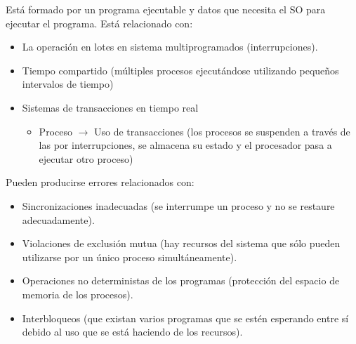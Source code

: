 \begin{definicion}[Proceso]
    Está formado por un programa ejecutable y datos que necesita el SO para ejecutar el programa. Está relacionado con:
    \begin{itemize}
        \item La operación en lotes en sistema multiprogramados (interrupciones).

        \item Tiempo compartido (múltiples procesos ejecutándose utilizando pequeños intervalos de tiempo)

        \item Sistemas de transacciones en tiempo real
        \begin{itemize}
            \item Proceso $\longrightarrow$ Uso de transacciones (los procesos se suspenden a través de las por interrupciones, se almacena su estado y el procesador pasa a ejecutar otro proceso) 
        \end{itemize}
    \end{itemize}

    Pueden producirse errores relacionados con:
    \begin{itemize}
        \item Sincronizaciones inadecuadas (se interrumpe un proceso y no se restaure adecuadamente).

        \item Violaciones de exclusión mutua (hay recursos del sistema que sólo pueden utilizarse por un único proceso simultáneamente).

        \item Operaciones no deterministas de los programas (protección del espacio de memoria de los procesos).

        \item Interbloqueos (que existan varios programas que se estén esperando entre sí debido al uso que se está haciendo de los recursos).
    \end{itemize}


\end{definicion}
